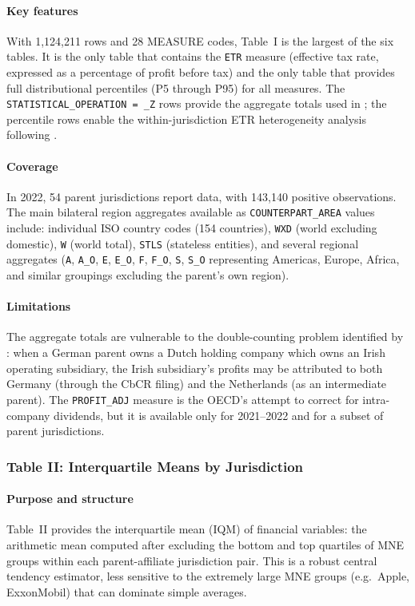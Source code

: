\documentclass[11pt,a4paper]{article}
\newcommand{\code}[1]{\texttt{#1}}
\begin{document}
\paragraph{Key features}
With 1,124,211 rows and 28 MEASURE codes, Table~I is the largest of the six tables. It is the only table that contains the \code{ETR} measure (effective tax rate, expressed as a percentage of profit before tax) and the only table that provides full distributional percentiles (P5 through P95) for all measures. The \code{STATISTICAL\_OPERATION = \_Z} rows provide the aggregate totals used in \citet{barake2022}; the percentile rows enable the within-jurisdiction ETR heterogeneity analysis following \citet{hugger2025}.

\paragraph{Coverage}
In 2022, 54 parent jurisdictions report data, with 143,140 positive observations. The main bilateral region aggregates available as \code{COUNTERPART\_AREA} values include: individual ISO country codes (154 countries), \code{WXD} (world excluding domestic), \code{W} (world total), \code{STLS} (stateless entities), and several regional aggregates (\code{A}, \code{A\_O}, \code{E}, \code{E\_O}, \code{F}, \code{F\_O}, \code{S}, \code{S\_O} representing Americas, Europe, Africa, and similar groupings excluding the parent's own region).

\paragraph{Limitations}
The aggregate totals are vulnerable to the double-counting problem identified by \citet{blouin2023}: when a German parent owns a Dutch holding company which owns an Irish operating subsidiary, the Irish subsidiary's profits may be attributed to both Germany (through the CbCR filing) and the Netherlands (as an intermediate parent). The \code{PROFIT\_ADJ} measure is the OECD's attempt to correct for intra-company dividends, but it is available only for 2021--2022 and for a subset of parent jurisdictions.

\subsubsection{Table II: Interquartile Means by Jurisdiction}\label{sec:table2}

\paragraph{Purpose and structure}
Table~II provides the interquartile mean (IQM) of financial variables: the arithmetic mean computed after excluding the bottom and top quartiles of MNE groups within each parent-affiliate jurisdiction pair. This is a robust central tendency estimator, less sensitive to the extremely large MNE groups (e.g.\ Apple, ExxonMobil) that can dominate simple averages.
\end{document}
